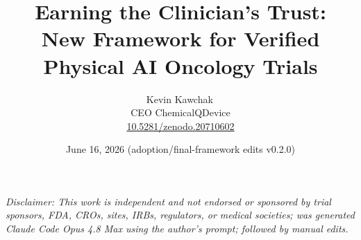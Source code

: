 \documentclass[11pt]{article}
\title{Earning the Clinician's Trust:\\New Framework for Verified Physical AI Oncology Trials}
\author{Kevin Kawchak\,\orcidicon{0009-0007-5457-8667}\\ CEO ChemicalQDevice\\ \href{https://doi.org/10.5281/zenodo.20710602}{10.5281/zenodo.20710602}}
\date{June 16, 2026 (adoption/final-framework edits v0.2.0)}
\begin{document}
\maketitle
\thispagestyle{empty}

\begin{abstract}

\end{abstract}

\vspace{0.2em}\noindent\footnotesize\textit{Disclaimer: This work is independent
and not endorsed or sponsored by trial sponsors, FDA, CROs, sites, IRBs,
regulators, or medical societies; was generated Claude Code Opus 4.8 Max using the author's prompt; followed by manual edits.}\normalsize\par




\tableofcontents
\vspace{0.3cm}










\clearpage


\clearpage
{}
\begingroup\raggedright\nocite{*}\endgroup


\end{document}
